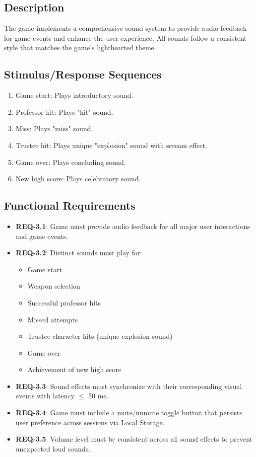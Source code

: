 \documentclass[11pt]{scrreprt}
\begin{document}
\subsection{Description}
The game implements a comprehensive sound system to provide audio feedback for game events and enhance the user experience. All sounds follow a consistent style that matches the game's lighthearted theme.

\subsection{Stimulus/Response Sequences}
\begin{enumerate}
  \item Game start: Plays introductory sound.
  \item Professor hit: Plays "hit" sound.
  \item Miss: Plays "miss" sound.
  \item Trustee hit: Plays unique "explosion" sound with scream effect.
  \item Game over: Plays concluding sound.
  \item New high score: Plays celebratory sound.
\end{enumerate}

\subsection{Functional Requirements}
\begin{itemize}
  \item \textbf{REQ-3.1}: Game must provide audio feedback for all major user interactions and game events.
  \item \textbf{REQ-3.2}: Distinct sounds must play for:
    \begin{itemize}
      \item Game start
      \item Weapon selection
      \item Successful professor hits
      \item Missed attempts
      \item Trustee character hits (unique explosion sound)
      \item Game over
      \item Achievement of new high score
    \end{itemize}
  \item \textbf{REQ-3.3}: Sound effects must synchronize with their corresponding visual events with latency $\leq$ 50 ms.
  \item \textbf{REQ-3.4}: Game must include a mute/unmute toggle button that persists user preference across sessions via Local Storage.
  \item \textbf{REQ-3.5}: Volume level must be consistent across all sound effects to prevent unexpected loud sounds.
\end{itemize}
\end{document}
